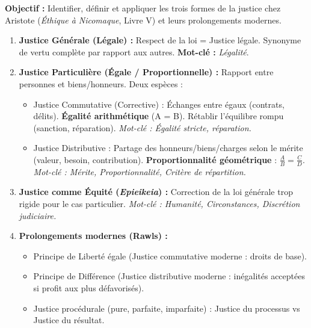 \documentclass[11pt]{article}
\newcommand{\cle}[1]{{\popxbold\color{popdark}#1}}
\begin{document}
\begin{methode}
    \textbf{Objectif :} Identifier, définir et appliquer les trois formes de la justice chez Aristote (\emph{Éthique à Nicomaque}, Livre V) et leurs prolongements modernes.
    \begin{enumerate}
        \item \textbf{Justice Générale (Légale) :} Respect de la loi = \cle{Justice légale}. Synonyme de vertu complète par rapport aux autres. \textbf{Mot-clé :} \emph{Légalité}.
        \item \textbf{Justice Particulière (Égale / Proportionnelle) :} Rapport entre personnes et biens/honneurs. Deux espèces :
            \begin{itemize}
                \item \cle{Justice Commutative (Corrective) :} Échanges entre égaux (contrats, délits). \textbf{Égalité arithmétique} (A = B). Rétablir l'équilibre rompu (sanction, réparation). \emph{Mot-clé : Égalité stricte, réparation.}
                \item \cle{Justice Distributive :} Partage des honneurs/biens/charges selon le \cle{mérite} (valeur, besoin, contribution). \textbf{Proportionnalité géométrique} : $\frac{A}{B} = \frac{C}{D}$. \emph{Mot-clé : Mérite, Proportionnalité, Critère de répartition.}
            \end{itemize}
        \item \textbf{Justice comme Équité (\emph{Epieikeia}) :} Correction de la loi générale trop rigide pour le cas particulier. \emph{Mot-clé : Humanité, Circonstances, Discrétion judiciaire.}
        \item \textbf{Prolongements modernes (Rawls) :} 
            \begin{itemize}
                \item Principe de \cle{Liberté égale} (Justice commutative moderne : droits de base).
                \item Principe de \cle{Différence} (Justice distributive moderne : inégalités acceptées si profit aux plus défavorisés).
                \item \cle{Justice procédurale} (pure, parfaite, imparfaite) : Justice du processus vs Justice du résultat.
            \end{itemize}
    \end{enumerate}
\end{methode}
\end{document}
